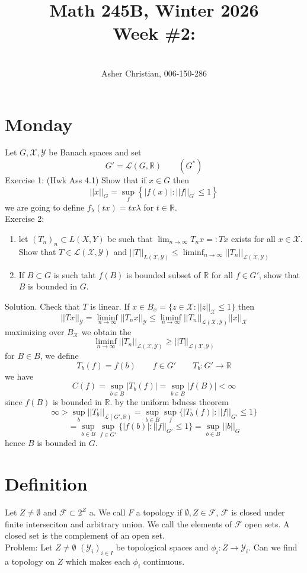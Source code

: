 \documentclass[11pt]{article}
\newcommand{\cnum}{Math 245B}
\newcommand{\ced}{Winter 2026}
\newcommand{\ctitle}[4]{\title{\vspace{-0.5in}\cnum, \ced\\Week #1: #2}\author{\vspace{-0.35in}\\#3, #4}}
\begin{document}
\ctitle{\#2}{}{Asher Christian}{006-150-286}
\date{}
\maketitle

\section{Monday}
Let $ G, \mathcal{X}, \mathcal{Y}$ be Banach spaces and set
\[
    G' = \mathcal{L}(G, \mathbb{R}) \qquad (G^{*} )
\] 
Exercise 1: (Hwk Ass 4.1)
Show that if $x \in G$ then
 \[
     ||x||_{G} = \sup_{f} \left\{ |f(x)| :  ||f||_{G^{'}} \le 1\right\}
\] 
we are going to define $f_\lambda(tx) = tx \lambda$ for $t \in \mathbb{R}$.\\
Exercise 2:
\begin{enumerate}
    \item let $(T_n)_n \subset L(X, Y)$  be such that $\lim_{n\to \infty} T_nx =: Tx$ exists for all $x \in \mathcal{X}$.
        Show that $T \in \mathcal{L}( \mathcal{X}, \mathcal{Y})$ and $||T||_{ L ( \mathcal{X}, \mathcal{Y})}  \le \liminf_{n\to \infty} ||T_n||_{ \mathcal{L}( \mathcal{X}, \mathcal{Y})}$
    \item If $B \subset G$ is such taht $f(B)$ is bounded subset of  $ \mathbb{R}$ for all $f \in G'$, show that  $B$ is bounded in  $G$.
\end{enumerate}
Solution. Check that $T$ is linear. If $x \in B_x = \{ z \in \mathcal{X} : ||z||_{ \mathcal{X}} \le 1 \}$
then
\[
    ||Tx||_{ \mathcal{Y}} = \liminf_{n\to \infty} ||T_n x||_{ \mathcal{Y}} \le \liminf_{n\to \infty} ||T_n||_{ \mathcal{L}( \mathcal{X}, \mathcal{Y})} ||x||_{ \mathcal{X}}
\] 
maximizing over $B_{ \mathcal{X}}$ we obtain the
\[
    \liminf_{n\to \infty} ||T_n||_{ \mathcal{L}( \mathcal{X}, \mathcal{Y}) } \ge ||T || _{ \mathcal{L}( \mathcal{X}, \mathcal{Y})}
\] 
for $B \in B$, we define
 \[
T_b(f) = f(b) \qquad f \in G'  \qquad T_b : G' \rightarrow \mathbb{R}
\] 
we have
\[
    C(f) = \sup_{b \in B}  |T_b(f)| = \sup_{b \in B} |f(B)| < \infty
\] 
since $f(B)$ is bounded in  $ \mathbb{R}$.
by the uniform bdness theorem
\[
    \infty > \sup_b ||T_b||_{ \mathcal{L}(G', \mathbb{R})} = \sup_{b \in B} \sup_{f} \{|T_b(f)| : ||f||_{G'} \le 1\}
\] 
\[
    = \sup_{b \in B} \sup_{f \in G'} \{|f(b)| : ||f||_{ G'} \le 1\} = \sup_{b \in B} ||b||_G
\] 
hence $B$ is bounded in $G$.

\section{Definition}
Let $Z \ne \emptyset $ and  $ \mathcal{F} \subset 2^{Z}$ a. We call $F$ a topology if $\emptyset, Z \in \mathcal{F}$, $ \mathcal{F}$ is closed under finite interseciton 
and arbitrary union. We call the elements of $ \mathcal{F}$ open sets. A closed set is the complement of an open set.
\\
Problem: Let $Z \ne \emptyset$  $( \mathcal{Y}_i)_{i \in I}$ be topological spaces and $\phi_i : Z \rightarrow \mathcal{Y}_i$.
Can we find a topology on $Z$ which makes each $\phi_i$ continuous.
\end{document}
